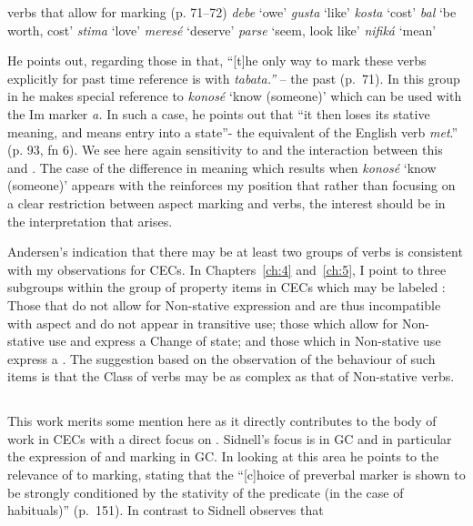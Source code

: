\ea\label{ex:2:19}  verbs that allow for 
marking (p. 71--72)
\ea \textit{debe} `owe'
\ex \textit{gusta} `like'
\ex \textit{kosta} `cost’ 
\ex \textit{bal} `be worth, cost' 
\ex \textit{stima} `love' 
\ex \textit{meresé} `deserve'
\ex \textit{parse} `seem, look like'
\ex \textit{nifiká} `mean'
\z \z

He points out, regarding those in  that, ``[t]he only way
to mark these verbs explicitly for past time reference is with
\textit{tabata.”} – the past   (p.~71).  In
this group in  he makes special reference to
\textit{konosé} `know (someone)’ which can be used with the
Im marker \textit{a.} In such a case, he points out
that ``it then loses its stative meaning, and means entry into a
state”- the equivalent of the English verb \textit{met}.'' (p. 93, fn 6).
We see here again sensitivity to  and the interaction
between this and .  The case of the difference in
meaning which results when \textit{konosé} `know (someone)' appears
with the   reinforces my position that rather
than focusing on a clear restriction between  aspect
marking and  verbs, the interest should be in the
interpretation that arises.

Andersen’s indication that there may be at least two groups of 
verbs is consistent with my observations for CECs.  In Chapters~\ref{ch:4} and~\ref{ch:5}, 
I point to three subgroups within the group of property items in
CECs which may be labeled : Those that do not allow for
Non-stative expression and are thus incompatible with 
aspect and do not appear in transitive use; those which allow for
Non-stative use and express a Change of state; and those which in
Non-stative use express a .  The suggestion based on the
observation of the behaviour of such items is that the Class of
 verbs may be as complex as that of Non-stative verbs.

\subsection{\citet{Sidnell2002}} %

This work merits some mention here as it directly contributes to the
body of work in CECs with a direct focus on .  Sidnell’s focus
is  in GC and in particular the expression of
 and  marking in GC.  In looking at this area he points to the relevance of  to 
marking, stating that the ``[c]hoice of preverbal marker is shown to be
strongly conditioned by the stativity of the predicate (in the case of
habituals)” (p.~151).  In contrast to \citet{Bickerton1975} Sidnell
observes that

